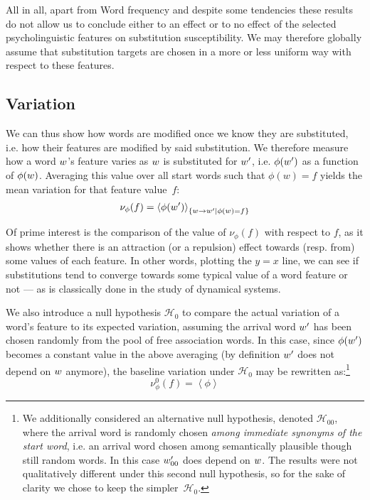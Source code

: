 All in all, apart from Word frequency and despite some tendencies these results do not allow us to conclude either to an effect or to no effect of the selected psycholinguistic features on substitution susceptibility.
We may therefore globally assume that substitution targets are chosen in a more or less uniform way with respect to these features.




\subsection{Variation}

We can thus show how words are modified once we know they are substituted, \hbox{i.e.} how their features are modified by said substitution.
We therefore measure how a word $w$'s feature varies as $w$ is substituted for $w'$, i.e. $\phi(w')$ as a function of $\phi(w)$.
Averaging this value over all start words such that $\phi(w) = f$ yields the mean variation for that feature value~$f$:
$$\nu_{\phi}(f) = \left<\phi(w')\right>_{\left\lbrace w\rightarrow w' | \phi(w) = f \right\rbrace}$$

Of prime interest is the comparison of the value of $\nu_{\phi}(f)$ with respect to $f$, as it shows whether there is an attraction (or a repulsion) effect towards (resp. from) some values of each feature.
In other words, plotting the $y=x$ line, we can see if substitutions tend to converge towards some typical value of a word feature or not --- as is classically done in the study of dynamical systems.

We also introduce a null hypothesis $\mathcal{H}_0$ to compare the actual variation of a word's feature to its expected variation, assuming the arrival word $w'$ has been chosen randomly from the pool of free association words.
In this case, since $\phi(w')$ becomes a constant value in the above averaging (by definition $w'$ does not depend on $w$ anymore),  the baseline variation under $\mathcal{H}_0$ may be rewritten as:\footnote{We additionally considered an alternative null hypothesis, denoted $\mathcal{H}_{00}$, where the arrival word is randomly chosen \emph{among immediate synonyms of the start word}, \hbox{i.e.} an arrival word chosen among semantically plausible though still random words. In this case $w'_{00}$ does depend on $w$. The results were not qualitatively different under this second null hypothesis, so for the sake of clarity we chose to keep the simpler~$\mathcal{H}_0$.}
$$\nu_{\phi}^0 (f) = \left<\phi\right>$$

